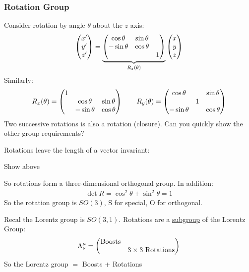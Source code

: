 \subsubsection{Rotation Group}
Consider rotation by angle $\theta$ about the $z$-axis:
\begin{align*}
  \pmqty{x'\\y'\\z'}=
  \underbrace{\pmqty{\cos\theta & \sin\theta&\\
      -\sin\theta&\cos\theta&\\&&1}}_{R_z(\theta)}
  \pmqty{x\\y\\z}
\end{align*}
Similarly:
\begin{align*}
  R_x(\theta)=
  \pmqty{1\\&\cos\theta&\sin\theta\\&-\sin\theta&\cos\theta}
  \qquad
  R_y(\theta)=
  \pmqty{\cos\theta&&\sin\theta\\&1&\\-\sin\theta&&\cos\theta}
\end{align*}
Two successive rotations is also a rotation (closure). Can you quickly show the other group requirements?

Rotations leave the length of a vector invariant:
\begin{TODO}
  Show above
\end{TODO}

So rotations form a three-dimensional orthogonal group. In addition:
\begin{align*}
  \det{R}=\cos^2\theta+\sin^2\theta=1
\end{align*}
So the rotation group is $SO(3)$, S for special, O for orthogonal.

Recal the Lorentz group is $SO(3,1)$. Rotations are a \underline{subgroup} of the Lorentz Group:
\begin{align*}
  \Lambda^\mu_\nu=\pmqty{\text{Boosts}&\\&3\times3\text{ Rotations}}
\end{align*}
So the Lorentz group $=$ Boosts + Rotations

